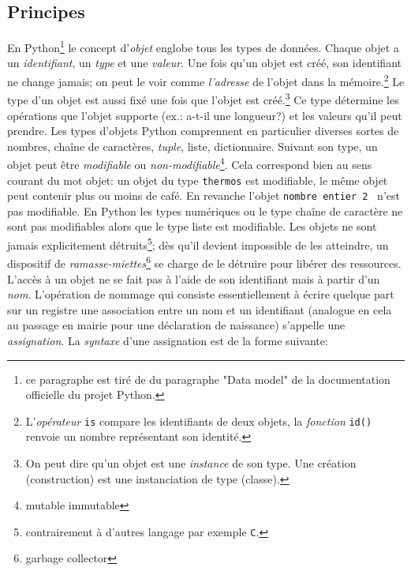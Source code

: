 \subsection{Principes}
En Python\footnote{ce paragraphe est tiré de du paragraphe "Data model" de la documentation officielle du projet Python.} le concept d'\emph{objet} englobe tous les types de données. 
Chaque objet a un \emph{identifiant}, un \emph{type} et une \emph{valeur}.\newline
Une fois qu'un objet est créé, son identifiant ne change jamais; on peut le voir comme \emph{l'adresse} de l'objet dans la mémoire.\footnote{L'\emph{opérateur} \texttt{is} compare les identifiants de deux objets, la \emph{fonction} \texttt{id()} renvoie un nombre représentant son identité.}\newline
Le type d'un objet est aussi fixé une fois que l'objet est créé.\footnote{On peut dire qu'un objet est une \emph{instance} de son type. Une création (construction) est une instanciation de type (classe).} Ce type détermine les opérations que l'objet supporte (ex.: a-t-il une longueur?) et les valeurs qu'il peut prendre. Les types d'objets Python comprennent en particulier diverses sortes de nombres, chaîne de caractères, \emph{tuple}, liste, dictionnaire.\newline
Suivant son type, un objet peut être \emph{modifiable} ou \emph{non-modifiable}\footnote{mutable immutable}. Cela correspond bien au sens courant du mot objet: un objet du type \texttt{thermos} est modifiable, le même objet peut contenir plus ou moins de café. En revanche l'objet \texttt{nombre entier 2} ~n'est pas modifiable. En Python les types numériques ou le type chaîne de caractère ne sont pas modifiables alors que le type liste est modifiable.\newline
Les objets ne sont jamais explicitement détruits\footnote{contrairement à d'autres langage par exemple \texttt{C}.}; dès qu'il devient impossible de les atteindre, un dispositif de \emph{ramasse-miettes}\footnote{garbage collector} se charge de le détruire pour libérer des ressources.\newline
L'accès à un objet ne se fait pas à l'aide de son identifiant mais à partir d'un \emph{nom}. L'opération de nommage qui consiste essentiellement à écrire quelque part sur un registre une association entre un nom et un identifiant (analogue en cela au passage en mairie pour une déclaration de naissance) s'appelle une \emph{assignation}.\newline 
La \emph{syntaxe} d'une assignation est de la forme suivante:
